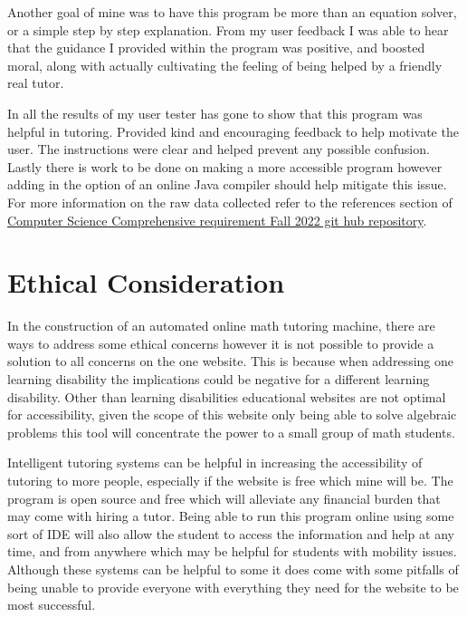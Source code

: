 \documentclass[10pt,twocolumn]{article}
\begin{document}
Another goal of mine was to have this program be more than an equation solver, or a simple step by step explanation. From my user feedback I was able to hear that the guidance I provided within the program was positive, and boosted moral, along with actually cultivating the feeling of being helped by a friendly real tutor. 

In all the results of my user tester has gone to show that this program was helpful in tutoring. Provided kind and encouraging feedback to help motivate the user. The instructions were clear and helped prevent any possible confusion. Lastly there is work to be done on making a more accessible program however adding in the option of an online Java compiler should help mitigate this issue. For more information on the raw data collected refer to the references section of \href{https://github.com/amthreatt/COMPS2022}{Computer Science Comprehensive requirement Fall 2022 git hub repository}.


\section{Ethical Consideration}
 In the construction of an automated online math tutoring machine, there are ways to address some ethical concerns however it is not possible to provide a solution to all concerns on the one website. This is because when addressing one learning disability the implications could be negative for a different learning disability. Other than learning disabilities educational websites are not optimal for accessibility, given the scope of this website only being able to solve algebraic problems this tool will concentrate the power to a small group of math students. 

Intelligent tutoring systems can be helpful in increasing the accessibility of tutoring to more people, especially if the website is free which mine will be. The program is open source and free which will alleviate any financial burden that may come with hiring a tutor. Being able to run this program online using some sort of IDE will also allow the student to access the information and help at any time, and from anywhere which may be helpful for students with mobility issues. Although these systems can be helpful to some it does come with some pitfalls of being unable to provide everyone with everything they need for the website to be most successful. 
\end{document}
